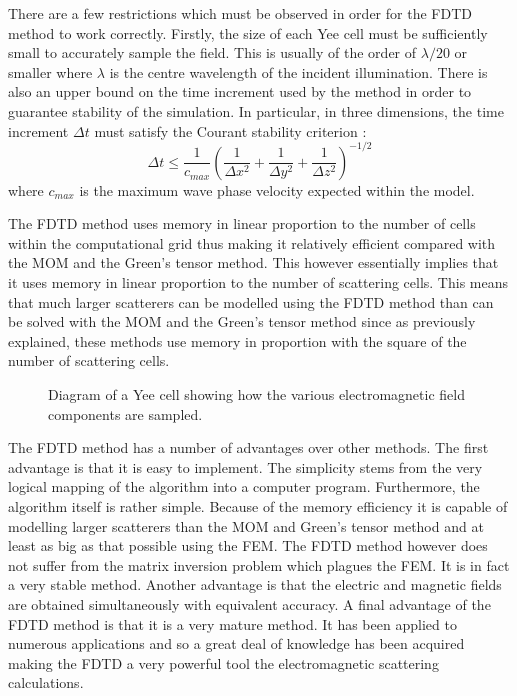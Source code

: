 \documentclass[a4paper, 12pt]{article}
\begin{document}
	There are a few restrictions which must be observed in order for the
	FDTD method to work correctly. Firstly, the size of each Yee cell must
	be sufficiently small to accurately sample the field. This is usually
	of the order of $\lambda/20$ or smaller where $\lambda$ is the centre
	wavelength of the incident illumination. There is also an upper bound
	on the time increment used by the method in order to guarantee
	stability of the simulation. In particular, in three dimensions, the
	time increment $\Delta t$ must satisfy the Courant stability criterion \cite{taflove75ieeetransmicrotheoryandtech623}:
	\begin{equation}
		\Delta t \leq \frac{1}{c_{max}}\left(\frac{1}{\Delta x^2} + \frac{1}{\Delta y^2} + \frac{1}{\Delta z^2}\right)^{-1/2}
		\label{eq:numermeth:courant}
	\end{equation}
	where $c_{max}$ is the maximum wave phase velocity expected within
	the model.

	The FDTD method uses memory in linear
	proportion to the number of cells within the computational grid thus
	making it relatively efficient compared with the
	MOM and the Green's tensor method. This however essentially
	implies that it uses memory in linear proportion to the number of
	scattering cells. This means that much larger scatterers can be
	modelled using the FDTD method than can be solved with the MOM and the
	Green's tensor method since as previously explained, these methods use
	memory in proportion with the square of the number of scattering cells.

	\begin{figure}[!h]
		\centering
		\caption{Diagram of a Yee cell \cite{yee66ieeetransantprop302,taflove75ieeetransmicrotheoryandtech623} showing how the various electromagnetic field
			components are sampled.}
		\label{fig:numermeth:yeediag}
	\end{figure}

	The FDTD method has a number of advantages over other methods. The
	first advantage is that it is easy to implement. The simplicity stems
	from the very logical mapping of the algorithm into a computer
	program. Furthermore, the algorithm itself is rather simple. Because
	of the memory efficiency it is
	capable of modelling larger scatterers than the MOM and Green's tensor
	method and at least as big
	as that possible using the FEM. The FDTD method however does not
	suffer from the matrix inversion problem which plagues the FEM. It is
	in fact a very stable method. Another advantage is that the electric
	and magnetic fields are obtained simultaneously with equivalent
	accuracy. A final advantage of the FDTD method is
	that it is a very mature method. It has been applied to numerous
	applications
	\cite{taflove75ieeetransmicrotheoryandtech888,kunz78ieeetransemc328,taflove80ieeetransemc191,sullivan88ieeetransbiomedeng179,joseph91opticsletters31}
	and so a great deal of knowledge has been acquired making the FDTD a
	very powerful tool the electromagnetic scattering calculations.
\end{document}
